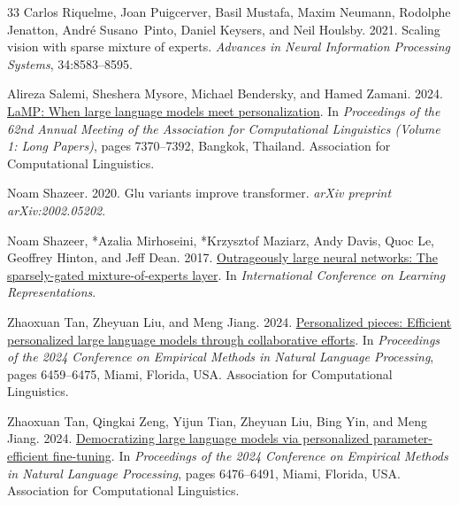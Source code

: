 \documentclass[11pt]{article}
\begin{document}
\begin{thebibliography}{33}
Carlos Riquelme, Joan Puigcerver, Basil Mustafa, Maxim Neumann, Rodolphe Jenatton, Andr{\'e} Susano~Pinto, Daniel Keysers, and Neil Houlsby. 2021.
\newblock Scaling vision with sparse mixture of experts.
\newblock \emph{Advances in Neural Information Processing Systems}, 34:8583--8595.

Alireza Salemi, Sheshera Mysore, Michael Bendersky, and Hamed Zamani. 2024.
\newblock \href {https://doi.org/10.18653/v1/2024.acl-long.399} {{L}a{MP}: When large language models meet personalization}.
\newblock In \emph{Proceedings of the 62nd Annual Meeting of the Association for Computational Linguistics (Volume 1: Long Papers)}, pages 7370--7392, Bangkok, Thailand. Association for Computational Linguistics.

Noam Shazeer. 2020.
\newblock Glu variants improve transformer.
\newblock \emph{arXiv preprint arXiv:2002.05202}.

Noam Shazeer, *Azalia Mirhoseini, *Krzysztof Maziarz, Andy Davis, Quoc Le, Geoffrey Hinton, and Jeff Dean. 2017.
\newblock \href {https://openreview.net/forum?id=B1ckMDqlg} {Outrageously large neural networks: The sparsely-gated mixture-of-experts layer}.
\newblock In \emph{International Conference on Learning Representations}.

Zhaoxuan Tan, Zheyuan Liu, and Meng Jiang. 2024{}.
\newblock \href {https://doi.org/10.18653/v1/2024.emnlp-main.371} {Personalized pieces: Efficient personalized large language models through collaborative efforts}.
\newblock In \emph{Proceedings of the 2024 Conference on Empirical Methods in Natural Language Processing}, pages 6459--6475, Miami, Florida, USA. Association for Computational Linguistics.

Zhaoxuan Tan, Qingkai Zeng, Yijun Tian, Zheyuan Liu, Bing Yin, and Meng Jiang. 2024{}.
\newblock \href {https://doi.org/10.18653/v1/2024.emnlp-main.372} {Democratizing large language models via personalized parameter-efficient fine-tuning}.
\newblock In \emph{Proceedings of the 2024 Conference on Empirical Methods in Natural Language Processing}, pages 6476--6491, Miami, Florida, USA. Association for Computational Linguistics.


\end{thebibliography}
\end{document}
